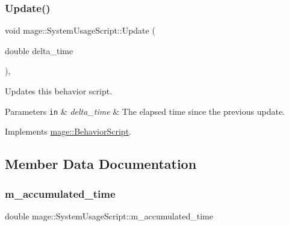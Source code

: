 \subsubsection{\texorpdfstring{Update()}{Update()}}
{\footnotesize\ttfamily void mage\+::\+System\+Usage\+Script\+::\+Update (\begin{DoxyParamCaption}\item[{double}]{delta\+\_\+time }\end{DoxyParamCaption})\hspace{0.3cm}{\ttfamily [override]}, {\ttfamily [virtual]}}

Updates this behavior script.


\begin{DoxyParams}[1]{Parameters}
\mbox{\tt in}  & {\em delta\+\_\+time} & The elapsed time since the previous update. \\
\hline
\end{DoxyParams}


Implements \hyperlink{classmage_1_1_behavior_script_a905b6c83640cb91d19fecab3435f6feb}{mage\+::\+Behavior\+Script}.



\subsection{Member Data Documentation}
\hypertarget{classmage_1_1_system_usage_script_ab8df9ff99617df9010c4c2f27a6ff9c8}{}\label{classmage_1_1_system_usage_script_ab8df9ff99617df9010c4c2f27a6ff9c8} 
\subsubsection{\texorpdfstring{m\+\_\+accumulated\+\_\+time}{m\_accumulated\_time}}
{\footnotesize\ttfamily double mage\+::\+System\+Usage\+Script\+::m\+\_\+accumulated\+\_\+time\hspace{0.3cm}{\ttfamily [private]}}

\hypertarget{classmage_1_1_system_usage_script_a4a49987cd15cdc2fa3d550a542191621}{}\label{classmage_1_1_system_usage_script_a4a49987cd15cdc2fa3d550a542191621} 

